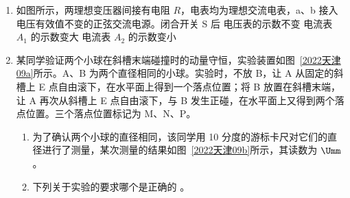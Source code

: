 \documentclass[\gkver]{gaokaozhenti}
\begin{document}
\begin{enumerate}
{B．若 a、b 光分别照射同一小孔发生衍射，根据发生明显衍射现象的条件，a 光的衍射现象更明显，故 B 正确；

C．在分别照射同一光电管发生光电效应时，根据爱因斯坦光电效应方程 $eU_{c} = E_{k} = h\nu - W_{0}$ 可知 a 光的遏止电压低，故 C 错误；

D．a、b 光分别作为同一双缝干涉装置光源时，相邻两条亮纹或暗纹的中心间距 $\Delta x = \frac{L}{d}\lambda$ 可知 a 光的干涉条纹间距大，故 D 正确。

故选 BD。
}

\item
如图所示，两理想变压器间接有电阻 $R$，电表均为理想交流电表，a、b 接入电压有效值不变的正弦交流电源。闭合开关 S 后
{电压表的示数不变}
{电流表 $A_{1}$ 的示数变大}
{电流表 $A_{2}$ 的示数变小}

\item
某同学验证两个小球在斜槽末端碰撞时的动量守恒，实验装置如图~\ref{2022天津09a}所示。A、B 为两个直径相同的小球。实验时，不放 B，让 A 从固定的斜槽上 E 点自由滚下，在水平面上得到一个落点位置；将 B 放置在斜槽末端，让 A 再次从斜槽上 E 点自由滚下，与 B 发生正碰，在水平面上又得到两个落点位置。三个落点位置标记为 M、N、P。
\begin{enumerate}
	\item
	为了确认两个小球的直径相同，该同学用 10 分度的游标卡尺对它们的直径进行了测量，某次测量的结果如图~\ref{2022天津09b}所示，其读数为 $\Umm$。
	\item
	下列关于实验的要求哪个是正确的 。


\end{enumerate}
\end{enumerate}
\end{document}
